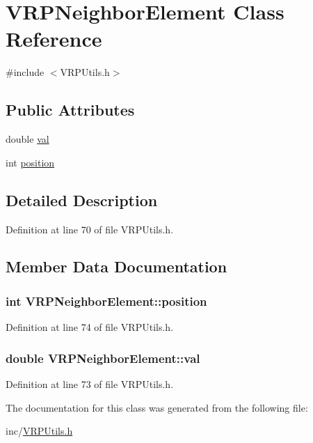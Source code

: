 \hypertarget{class_v_r_p_neighbor_element}{
\section{VRPNeighborElement Class Reference}
\label{class_v_r_p_neighbor_element}
}


{\ttfamily \#include $<$VRPUtils.h$>$}

\subsection*{Public Attributes}
\begin{DoxyCompactItemize}
\item 
double \hyperlink{class_v_r_p_neighbor_element_ad0e14c29e61d2af403aaae14488cea7a}{val}
\item 
int \hyperlink{class_v_r_p_neighbor_element_a5bdb88508a4064825fa6a42d16426542}{position}
\end{DoxyCompactItemize}


\subsection{Detailed Description}


Definition at line 70 of file VRPUtils.h.



\subsection{Member Data Documentation}
\hypertarget{class_v_r_p_neighbor_element_a5bdb88508a4064825fa6a42d16426542}{
\subsubsection[{position}]{\setlength{\rightskip}{0pt plus 5cm}int {\bf VRPNeighborElement::position}}}
\label{class_v_r_p_neighbor_element_a5bdb88508a4064825fa6a42d16426542}


Definition at line 74 of file VRPUtils.h.

\hypertarget{class_v_r_p_neighbor_element_ad0e14c29e61d2af403aaae14488cea7a}{
\subsubsection[{val}]{\setlength{\rightskip}{0pt plus 5cm}double {\bf VRPNeighborElement::val}}}
\label{class_v_r_p_neighbor_element_ad0e14c29e61d2af403aaae14488cea7a}


Definition at line 73 of file VRPUtils.h.



The documentation for this class was generated from the following file:\begin{DoxyCompactItemize}
\item 
inc/\hyperlink{_v_r_p_utils_8h}{VRPUtils.h}\end{DoxyCompactItemize}
